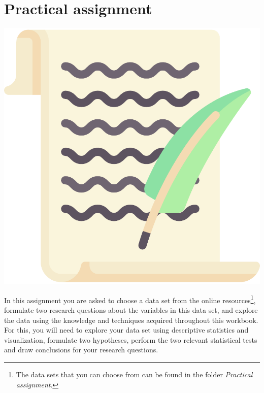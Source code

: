 
\begin{minipage}{0.8\textwidth}
\section{Practical assignment}
\end{minipage}%
\hfill%
\begin{minipage}{0.1\textwidth}
\includegraphics[width=\linewidth]{Files/Images/lettericon.pdf}
\end{minipage}
\vspace*{.1cm}

In this assignment you are asked to choose a data set from the online resources\footnote{The data sets that you can choose from can be found in the folder \textit{Practical assignment}.}, formulate two research questions about the variables in this data set, and explore the data using the knowledge and techniques acquired throughout this workbook. For this, you will need to explore your data set using descriptive statistics and visualization, formulate two hypotheses, perform the two relevant statistical tests and draw conclusions for your research questions. \\

